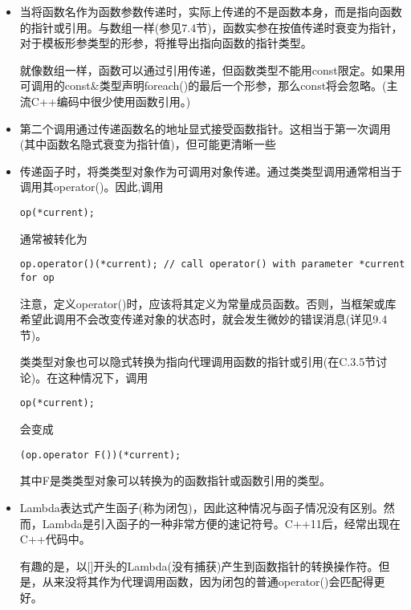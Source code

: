\begin{itemize}
\item 
当将函数名作为函数参数传递时，实际上传递的不是函数本身，而是指向函数的指针或引用。与数组一样(参见7.4节)，函数实参在按值传递时衰变为指针，对于模板形参类型的形参，将推导出指向函数的指针类型。

就像数组一样，函数可以通过引用传递，但函数类型不能用const限定。如果用可调用的const\&类型声明foreach()的最后一个形参，那么const将会忽略。(主流C++编码中很少使用函数引用。)

\item 
第二个调用通过传递函数名的地址显式接受函数指针。这相当于第一次调用(其中函数名隐式衰变为指针值)，但可能更清晰一些

\item 
传递函子时，将类类型对象作为可调用对象传递。通过类类型调用通常相当于调用其operator()。因此,调用

\begin{lstlisting}[style=styleCXX]
op(*current);
\end{lstlisting}

通常被转化为

\begin{lstlisting}[style=styleCXX]
op.operator()(*current); // call operator() with parameter *current for op
\end{lstlisting}

注意，定义operator()时，应该将其定义为常量成员函数。否则，当框架或库希望此调用不会改变传递对象的状态时，就会发生微妙的错误消息(详见9.4节)。

类类型对象也可以隐式转换为指向代理调用函数的指针或引用(在C.3.5节讨论)。在这种情况下，调用

\begin{lstlisting}[style=styleCXX]
op(*current);
\end{lstlisting}

会变成

\begin{lstlisting}[style=styleCXX]
(op.operator F())(*current);
\end{lstlisting}

其中F是类类型对象可以转换为的函数指针或函数引用的类型。

\item 
Lambda表达式产生函子(称为闭包)，因此这种情况与函子情况没有区别。然而，Lambda是引入函子的一种非常方便的速记符号。C++11后，经常出现在C++代码中。

有趣的是，以[]开头的Lambda(没有捕获)产生到函数指针的转换操作符。但是，从来没将其作为代理调用函数，因为闭包的普通operator()会匹配得更好。
\end{itemize}

